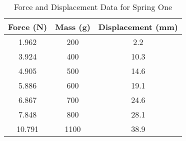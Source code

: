 
\begin{table}[H]
	\centering
	\caption{Force and Displacement Data for Spring One\label{table1}}
	\begin{tabular}{ccc}
		\hline
		\textbf{Force (N)} & \textbf{Mass (g)} & \textbf{Displacement (mm)} \\
		\hline
		1.962              & 200               & 2.2                        \\
		3.924              & 400               & 10.3                       \\
		4.905              & 500               & 14.6                       \\
		5.886              & 600               & 19.1                       \\
		6.867              & 700               & 24.6                       \\
		7.848              & 800               & 28.1                       \\
		10.791             & 1100              & 38.9                       \\
		\hline
	\end{tabular}
\end{table}
